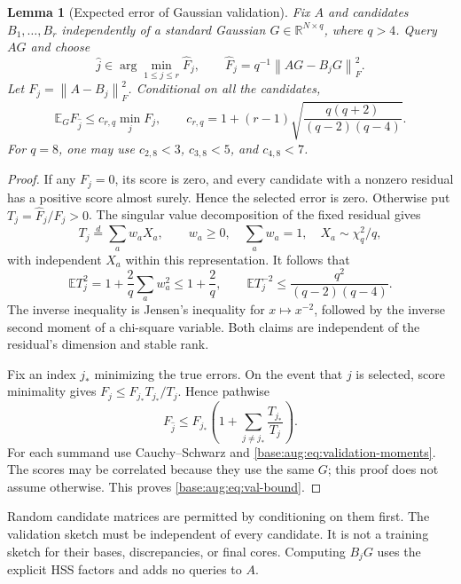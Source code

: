 \documentclass[11pt,oneside,openany,a4paper]{book}
\numberwithin{equation}{chapter}
\newtheorem{lemma}[theorem]{Lemma}
\theoremstyle{definition}
\theoremstyle{remark}
\newcommand{\R}{\mathbb R}\newcommand{\E}{\mathbb E}\newcommand{\Prb}{\mathbb P}\newcommand{\PP}{\mathbb P}
\newcommand{\F}[1]{\left\lVert#1\right\rVert_F}
\begin{document}
\begin{lemma}[Expected error of Gaussian validation]\label{base:aug:lem:validation}
Fix $A$ and candidates $B_1,\ldots,B_r$ independently of a standard Gaussian
$G\in\R^{N\times q}$, where $q>4$. Query $AG$ and choose
\begin{equation}\label{base:aug:eq:selection}
 \widehat j\in\arg\min_{1\le j\le r}
       \widehat F_j,
 \qquad \widehat F_j=q^{-1}\F{AG-B_jG}^2.
\end{equation}
Let $F_j=\F{A-B_j}^2$. Conditional on all the candidates,
\begin{equation}\label{base:aug:eq:val-bound}
 \E_G F_{\widehat j}\le c_{r,q}\min_jF_j,
 \qquad
 c_{r,q}=1+(r-1)\sqrt{\frac{q(q+2)}{(q-2)(q-4)}}.
\end{equation}
For $q=8$, one may use $c_{2,8}<3$, $c_{3,8}<5$, and $c_{4,8}<7$.
\end{lemma}
\begin{proof}
If any $F_j=0$, its score is zero, and every candidate with a nonzero
residual has a positive score almost surely. Hence the selected error is
zero. Otherwise put $T_j=\widehat F_j/F_j>0$. The singular value
decomposition of the fixed residual gives
\[
 T_j\overset{d}=\sum_a w_aX_a,\qquad
 w_a\ge0,\quad\sum_aw_a=1,\quad X_a\sim\chi_q^2/q,
\]
with independent $X_a$ within this representation. It follows that
\begin{equation}\label{base:aug:eq:validation-moments}
 \E T_j^2=1+\frac2q\sum_aw_a^2\le1+\frac2q,
 \qquad
 \E T_j^{-2}\le\frac{q^2}{(q-2)(q-4)}.
\end{equation}
The inverse inequality is Jensen's inequality for $x\mapsto x^{-2}$,
followed by the inverse second moment of a chi-square variable. Both
claims are independent of the residual's dimension and stable rank.

Fix an index $j_*$ minimizing the true errors. On the event that $j$ is
selected, score minimality gives
$F_j\le F_{j_*}T_{j_*}/T_j$. Hence pathwise
\[
 F_{\widehat j}\le F_{j_*}
      \left(1+\sum_{j\ne j_*}\frac{T_{j_*}}{T_j}\right).
\]
For each summand use Cauchy--Schwarz and
\eqref{base:aug:eq:validation-moments}. The scores may be correlated because they
use the same $G$; this proof does not assume otherwise. This proves
\eqref{base:aug:eq:val-bound}.
\end{proof}

Random candidate matrices are permitted by conditioning on them first.
The validation sketch must be independent of every candidate. It is not a
training sketch for their bases, discrepancies, or final cores. Computing
$B_jG$ uses the explicit HSS factors and adds no queries to $A$.
\end{document}
